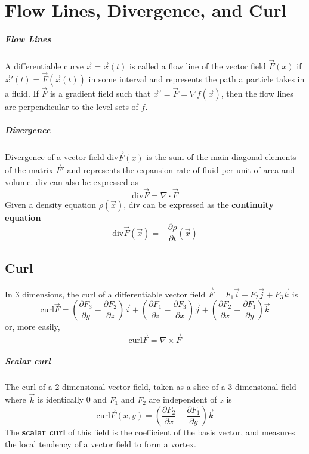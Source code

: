 \documentclass[11pt]{article}
\begin{document}
\section{Flow Lines, Divergence, and Curl}
	\subparagraph{Flow Lines} A differentiable curve $\vec{x} = \vec{x}(t)$ is called a flow line of the vector field $\vec{F}(x)$ if $\vec{x}'(t) = \vec{F}(\vec{x}(t))$ in some interval and represents the path a particle takes in a fluid. If $\vec{F}$ is a gradient field such that $\vec{x}' = \vec{F} = \nabla f(\vec{x})$, then the flow lines are perpendicular to the level sets of $f$.
	
	\subparagraph{Divergence} Divergence of a vector field div$\vec{F}(x)$ is the sum of the main diagonal elements of the matrix $\vec{F}'$ and represents the expansion rate of fluid per unit of area and volume. div can also be expressed as
	\begin{equation}
		\text{div} \vec{F} = \nabla \cdot \vec{F}
	\end{equation}
	Given a density equation $\rho (\vec{x})$, div can be expressed as the \textbf{continuity equation}
	\begin{equation}
		\text{div} \vec{F}(\vec{x}) = -\frac{\partial \rho}{\partial t} (\vec{x})
	\end{equation}
	
	\subsection{Curl} 
		In 3 dimensions, the curl of a differentiable vector field $\vec{F} = F_1 \vec{i} + F_2 \vec{j} + F_3 \vec{k}$ is
		\begin{equation}
			\text{curl}\vec{F} = \left(\frac{\partial F_3}{\partial y} - \frac{\partial F_2}{\partial z} \right) \vec{i} + \left(\frac{\partial F_1}{\partial z} - \frac{\partial F_3}{\partial x} \right) \vec{j} + \left(\frac{\partial F_2}{\partial x} - \frac{\partial F_1}{\partial y} \right) \vec{k}
		\end{equation}
		or, more easily,
		\begin{equation}
			\text{curl}\vec{F} = \nabla \times \vec{F}
		\end{equation}
		
		\subparagraph{Scalar curl} The curl of a 2-dimensional vector field, taken as a slice of a 3-dimensional field where $\vec{k}$ is identically 0 and $F_1$ and $F_2$ are independent of $z$ is
		\begin{equation}
			\text{curl} \vec{F}(x, y) = \left(\frac{\partial F_2}{\partial x} - \frac{\partial F_1}{\partial y} \right)\vec{k}
		\end{equation}
		The \textbf{scalar curl} of this field is the coefficient of the basis vector, and measures the local tendency of a vector field to form a vortex.
		
\end{document}
